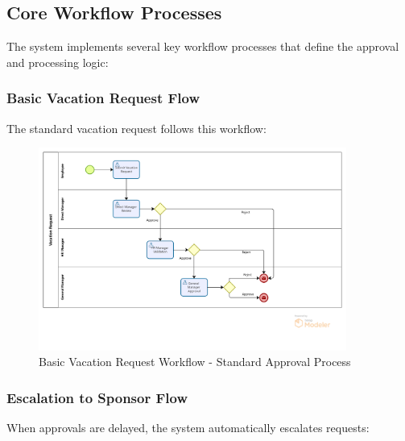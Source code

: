 \documentclass[12pt,a4paper]{article}
\begin{document}
\subsection{Core Workflow Processes}
The system implements several key workflow processes that define the approval and processing logic:

\subsubsection{Basic Vacation Request Flow}
The standard vacation request follows this workflow:

\begin{figure}[H]
\centering
\includegraphics[width=0.9\textwidth]{Diagrams/Workflows/Vacation-Request-Basic-Flow/Vacation-Request-Basic-Flow.png}
\caption{Basic Vacation Request Workflow - Standard Approval Process}
\label{fig:basic-flow}
\end{figure}

\subsubsection{Escalation to Sponsor Flow}
When approvals are delayed, the system automatically escalates requests:
\end{document}
